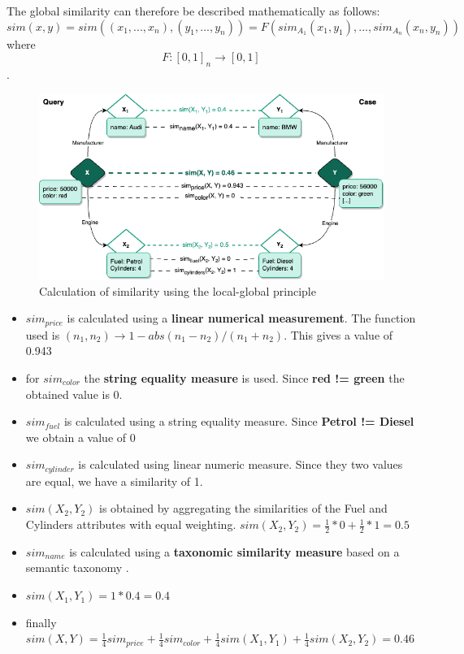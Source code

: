    The global similarity can therefore be described mathematically as follows:\\
    \[sim(x,y) = sim((x_1,...,x_n),(y_1,...,y_n)) = F(sim_{A_1}(x_1, y_1),..., sim_{A_n}(x_n, y_n) )\] where \[F: [0,1]_n \rightarrow [0,1]\].\\


    \begin{figure}[h]
    \centering
    \includegraphics[scale=0.6]{images/Concept-CBR Exemple.drawio.png}
    \caption{\label{fig:cbr-exam}  Calculation of similarity using the local-global principle}
    \end{figure}
    
    \begin{itemize}
        \item $sim_{price}$ is calculated using a \textbf{linear numerical measurement}. The function used is $(n_1, n_2) \rightarrow 1 - abs(n_1 - n_2) / (n_1 + n_2)$. This gives a value of 0.943
        \item for $sim_{color}$ the \textbf{string equality measure} is used. Since \textbf{red != green} the obtained value is 0.
        \item $sim_{fuel}$ is calculated using a string equality measure. Since \textbf{Petrol != Diesel} we obtain a value of 0
        \item $sim_{cylinder}$ is calculated using linear numeric measure. Since they two values are equal, we have a similarity of 1.
        \item $sim(X_2, Y_2)$ is obtained by aggregating the similarities of the Fuel and Cylinders attributes with equal weighting. $sim(X_2, Y_2) = \frac{1}{2} * 0 + \frac{1}{2} * 1 = 0.5$
        \item $sim_{name}$ is calculated using a \textbf{taxonomic similarity measure} based on a semantic taxonomy \cite{malburg2021improving}.
        \item $sim(X_1, Y_1) = 1 * 0.4 = 0.4$
        \item finally $sim(X, Y) = \frac{1}{4} sim_{price} + \frac{1}{4} sim_{color} + \frac{1}{4} sim(X_1, Y_1) + \frac{1}{4} sim(X_2, Y_2) = 0.46$

    \end{itemize}

